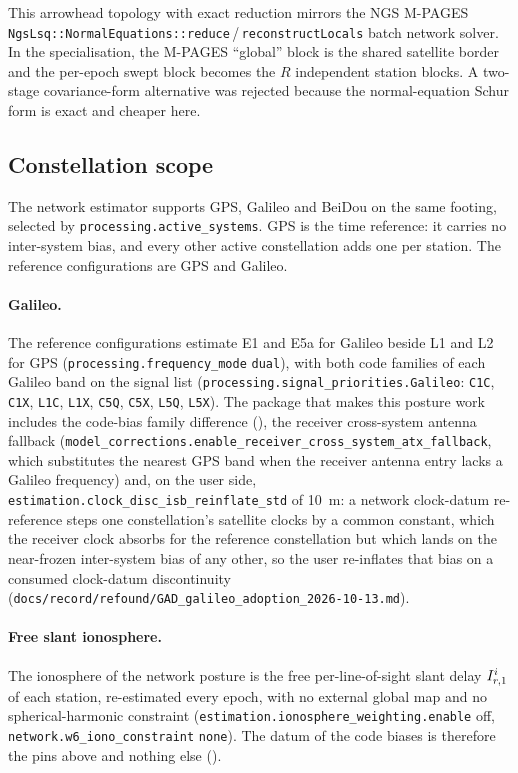\documentclass[main.tex]{subfiles}
\begin{document}
\begin{remark}
This arrowhead topology with exact reduction mirrors the NGS M-PAGES
\texttt{NgsLsq::NormalEquations::reduce}\,/\,\texttt{reconstructLocals}
batch network solver. In the specialisation, the M-PAGES ``global''
block is the shared satellite border and the per-epoch swept block
becomes the $R$ independent station blocks. A two-stage covariance-form
alternative was rejected because the normal-equation Schur form is
exact and cheaper here.
\end{remark}

\subsection{Constellation scope}\label{sec:net-constellations}

The network estimator supports GPS, Galileo and BeiDou on the same
footing, selected by \texttt{processing.active\_systems}. GPS is the time
reference: it carries no inter-system bias, and every other active
constellation adds one per station. The reference configurations are
GPS and Galileo.

\paragraph{Galileo.}
The reference configurations estimate E1 and E5a for Galileo beside L1
and L2 for GPS (\texttt{processing.frequency\_mode} \texttt{dual}), with
both code families of each Galileo band on the signal list
(\texttt{processing.signal\_priorities.Galileo}:
\texttt{C1C}, \texttt{C1X}, \texttt{L1C}, \texttt{L1X}, \texttt{C5Q},
\texttt{C5X}, \texttt{L5Q}, \texttt{L5X}). The package that makes this
posture work includes the code-bias family difference
(), the receiver cross-system antenna fallback
(\texttt{model\_corrections.enable\_receiver\_cross\_system\_atx\_fallback},
which substitutes the nearest GPS band when the receiver antenna entry
lacks a Galileo frequency) and, on the user side,
\texttt{estimation.clock\_disc\_isb\_reinflate\_std} of
\SI{10}{\metre}: a network clock-datum re-reference steps one
constellation's satellite clocks by a common constant, which the receiver
clock absorbs for the reference constellation but which lands on the
near-frozen inter-system bias of any other, so the user re-inflates that
bias on a consumed clock-datum discontinuity
(\texttt{docs/record/refound/GAD\_galileo\_adoption\_2026-10-13.md}).

\paragraph{Free slant ionosphere.}
The ionosphere of the network posture is the free per-line-of-sight
slant delay $I^i_{r,1}$ of each station, re-estimated every epoch,
with no external global map and no spherical-harmonic constraint
(\texttt{estimation.ionosphere\_weighting.enable} off,
\texttt{network.w6\_iono\_constraint} \texttt{none}). The datum of the
code biases is therefore the pins above and nothing else
().
\end{document}
